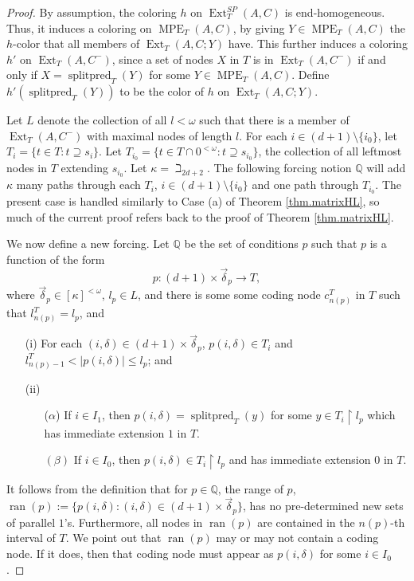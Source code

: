 \documentclass{amsart}
\theoremstyle{remark}
\theoremstyle{definition}
\theoremstyle{remark}
\newcommand{\al}{\alpha}
\newcommand{\om}{\omega}
\newcommand{\contains}{\supseteq}
\DeclareMathOperator{\ran}{ran}
\DeclareMathOperator{\Ext}{Ext}
\DeclareMathOperator{\splitpred}{splitpred}
\DeclareMathOperator{\MPE}{MPE}
\newcommand{\re}{\restriction}
\newcommand{\bQ}{\mathbb{Q}}
\newcommand{\ra}{\rightarrow}
\begin{document}
\begin{proof}
By assumption,
the coloring $h$ on $\Ext_{T}^{SP}(A,C)$  is end-homogeneous.
Thus, it induces a coloring on $\MPE_T(A,C)$,
by giving $Y\in\MPE_T(A,C)$ the $h$-color that all members of $\Ext_T(A,C;Y)$ have.
This further
induces a coloring $h'$  on $\Ext_{T}(A,C^-)$,
since a  set of nodes $X$ in  $T$ is in
$ \Ext_T(A,C^-)$
if and only if $X=\splitpred_T(Y)$ for some   $Y\in\MPE_T(A,C)$.
Define $h'(\splitpred_T(Y))$ to be the color of $h$ on  $\Ext_{T}(A,C;Y)$.



Let $L$ denote the collection of all  $l<\om$ such that there is a member of
 $\Ext_{T}(A,C^-)$ with maximal  nodes of length $l$.
For each
  $i\in (d+1)\setminus\{i_0\}$,   let  $T_i=\{t\in T:t\contains s_i\}$.
Let $T_{i_0}=\{t\in T\cap 0^{<\om}:t\contains s_{i_0}\}$, the collection of all leftmost nodes in $T$ extending $s_{i_0}$.
Let $\kappa=\beth_{2d+2}$.
The following forcing notion $\bQ$  will  add $\kappa$ many paths through each $T_i$, $i\in (d+1)\setminus\{i_0\}$ and
 one path through $T_{i_0}$.
The present case is handled similarly to Case (a) of Theorem \ref{thm.matrixHL}, so much of the  current proof refers back to the proof of Theorem \ref{thm.matrixHL}.



We now define a new forcing.
Let
$\bQ$ be  the set of conditions $p$ such that
$p$ is a  function
of the form
$$
p:(d+1)\times\vec{\delta}_p\ra  T,
$$
where $\vec{\delta}_p\in[\kappa]^{<\om}$,
$l_p\in L$,
 and
there  is  some
some coding node
$c^{T}_{n(p)}$ in $T$
 such that $l^{T}_{n(p)}=l_p$,
and
\begin{enumerate}
\item[(i)]
 For each $(i,\delta)\in (d+1)\times
\vec{\delta}_p$,
$p(i,\delta)\in T_i$ and
 $l^{T}_{n(p)-1}< |p(i,\delta)|\le l_p$; and

\item [(ii)]
\begin{enumerate}
\item[($\al$)]
If  $i\in I_1$,
 then
 $p(i,\delta)=\splitpred_{T}(y)$ for some $y\in T_i\re l_p$
which has immediate extension $1$ in $T$.
\item[$(\beta)$]
If $i\in I_0$,  then
$p(i,\delta)\in T_i\re l_p$ and has immediate extension $0$ in $T$.
\end{enumerate}
\end{enumerate}
It follows from the definition  that for $p\in \bQ$,
the range  of $p$, $\ran(p):=\{p(i,\delta):(i,\delta)\in (d+1)\times\vec{\delta}_p\}$, has no pre-determined new sets of parallel $1$'s.
Furthermore, all nodes in $\ran(p)$ are contained in the $n(p)$-th interval of $T$.
We point out that  $\ran(p)$ may or may not contain a coding node.
If it does, then that coding node must appear as $p(i,\delta)$ for some $i\in I_0$.



\end{proof}
\end{document}
